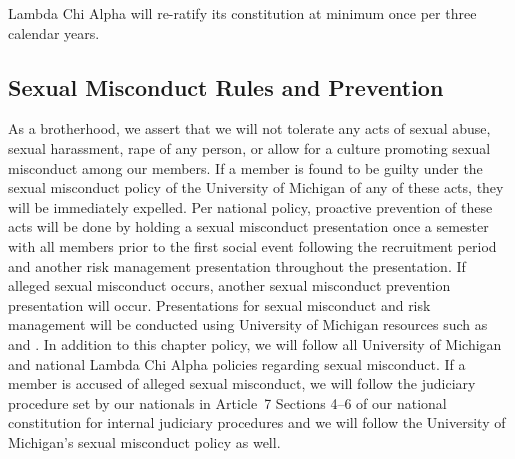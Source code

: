 \documentclass{article}
\begin{document}
Lambda Chi Alpha will re-ratify its constitution at minimum once per three
calendar years.

\subsection{Sexual Misconduct Rules and Prevention}

As a brotherhood, we assert that we will not tolerate any acts of sexual abuse,
sexual harassment, rape of any person, or allow for a culture promoting sexual
misconduct among our members. If a member is found to be guilty under the sexual
misconduct policy of the University of Michigan of any of these acts, they will
be immediately expelled. Per national policy, proactive prevention of these acts
will be done by holding a sexual misconduct presentation once a semester with
all members prior to the first social event following the recruitment period and
another risk management presentation throughout the presentation. If alleged
sexual misconduct occurs, another sexual misconduct prevention presentation will
occur. Presentations for sexual misconduct and risk management will be conducted
using University of Michigan resources such as  and
. In addition to this chapter policy, we will follow all
University of Michigan and national Lambda Chi Alpha policies regarding sexual
misconduct. If a member is accused of alleged sexual misconduct, we will follow
the judiciary procedure set by our nationals in Article~7 Sections 4–6 of our
national constitution for internal judiciary procedures and we will follow the
University of Michigan’s sexual misconduct policy as well.
\end{document}
